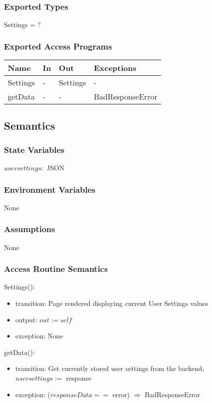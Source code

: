 \documentclass[12pt, titlepage]{article}
\begin{document}
\subsubsection{Exported Types}
Settings = ?
\subsubsection{Exported Access Programs}
\begin{center}
	\begin{tabular}{p{2cm} p{4cm} p{4cm} p{2cm}}
		\hline
		\textbf{Name} & \textbf{In} & \textbf{Out} & \textbf{Exceptions} \\
		\hline
		Settings & - & Settings & - \\
		getData & - & - & BadResponseError\\
		\hline
	\end{tabular}
\end{center}
\subsection{Semantics}
\subsubsection{State Variables}
$usersettings : $ JSON
\subsubsection{Environment Variables}
None
\subsubsection{Assumptions}
None
\subsubsection{Access Routine Semantics}
\noindent Settings():
\begin{itemize}
	\item transition: Page rendered displaying current User Settings values
	\item output: $out := self$
	\item exception: None
\end{itemize}
\noindent getData():
\begin{itemize}
	\item transition: Get currently stored user settings from the backend, 
	$usersettings :=$ response
	\item exception: ($responseData ==$ error) $\Rightarrow$ BadResponseError
\end{itemize}
\end{document}
